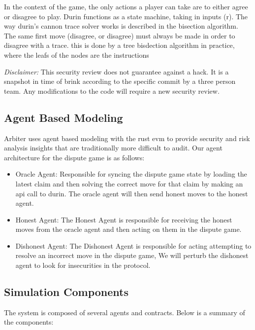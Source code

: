 In the context of the game, the only actions a player can take are to either agree or disagree to play. Durin functions as a state machine, taking in inputs (r).
The way durin's cannon trace solver works is described in the bisection algorithm. The same first move (disagree, or disagree) must always be made in order to disagree with a trace.
this is done by a tree bisdection algorithm in practice, where the leafs of the nodes are the instructions 

\emph{Disclaimer:} This security review does not guarantee against a
hack. It is a snapshot in time of brink according to the specific commit
by a three person team. Any modifications to the code will require a new
security review.

\subsection{Agent Based Modeling}\label{agent-based-modeling}

Arbiter uses agent based modeling with the rust evm to provide security
and risk analysis insights that are traditionally more difficult to
audit. Our agent architecture for the dispute game is as follows:

\begin{itemize}
\tightlist
\item
  Oracle Agent: Responsible for syncing the dispute game state by
  loading the latest claim and then solving the correct move for that
  claim by making an api call to durin. The oracle agent will then send
  honest moves to the honest agent.
\item
  Honest Agent: The Honest Agent is responsible for receiving the honest
  moves from the oracle agent and then acting on them in the dispute
  game.
\item
  Dishonest Agent: The Dishonest Agent is responsible for acting
  attempting to resolve an incorrect move in the dispute game, We will
  perturb the dishonest agent to look for insecurities in the protocol.
\end{itemize}

\subsection{Simulation Components}\label{simulation-components}

The system is composed of several agents and contracts. Below is a summary of the components:

